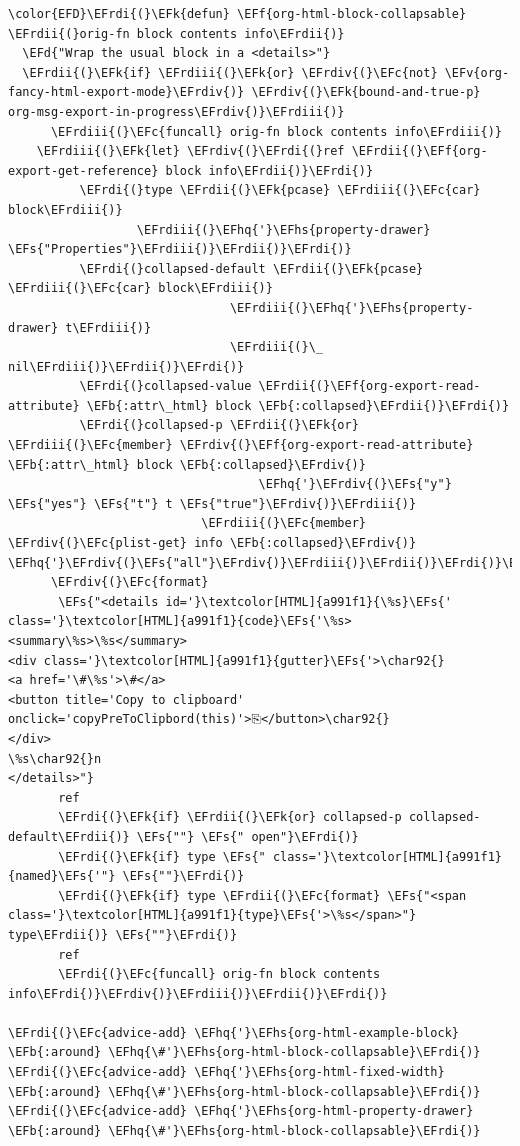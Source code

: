 \documentclass{scrartcl}
\newcommand{\EFk}[1]{\textcolor{EFk}{#1}} %
\newcommand{\EFd}[1]{\textcolor{EFd}{#1}} %
\newcommand{\EFs}[1]{\textcolor{EFs}{#1}} %
\newcommand{\EFb}[1]{\textcolor{EFb}{#1}} %
\newcommand{\EFc}[1]{\textcolor{EFc}{#1}} %
\newcommand{\EFv}[1]{\textcolor{EFv}{#1}} %
\newcommand{\EFf}[1]{\textcolor{EFf}{#1}} %
\newcommand{\EFhq}[1]{#1} %
\newcommand{\EFhs}[1]{#1} %
\newcommand{\EFrdi}[1]{#1} %
\newcommand{\EFrdii}[1]{#1} %
\newcommand{\EFrdiii}[1]{#1} %
\newcommand{\EFrdiv}[1]{#1} %
\begin{document}
\begin{Code}
\begin{Verbatim}[]
\color{EFD}\EFrdi{(}\EFk{defun} \EFf{org-html-block-collapsable} \EFrdii{(}orig-fn block contents info\EFrdii{)}
  \EFd{"Wrap the usual block in a <details>"}
  \EFrdii{(}\EFk{if} \EFrdiii{(}\EFk{or} \EFrdiv{(}\EFc{not} \EFv{org-fancy-html-export-mode}\EFrdiv{)} \EFrdiv{(}\EFk{bound-and-true-p} org-msg-export-in-progress\EFrdiv{)}\EFrdiii{)}
      \EFrdiii{(}\EFc{funcall} orig-fn block contents info\EFrdiii{)}
    \EFrdiii{(}\EFk{let} \EFrdiv{(}\EFrdi{(}ref \EFrdii{(}\EFf{org-export-get-reference} block info\EFrdii{)}\EFrdi{)}
          \EFrdi{(}type \EFrdii{(}\EFk{pcase} \EFrdiii{(}\EFc{car} block\EFrdiii{)}
                  \EFrdiii{(}\EFhq{'}\EFhs{property-drawer} \EFs{"Properties"}\EFrdiii{)}\EFrdii{)}\EFrdi{)}
          \EFrdi{(}collapsed-default \EFrdii{(}\EFk{pcase} \EFrdiii{(}\EFc{car} block\EFrdiii{)}
                               \EFrdiii{(}\EFhq{'}\EFhs{property-drawer} t\EFrdiii{)}
                               \EFrdiii{(}\_ nil\EFrdiii{)}\EFrdii{)}\EFrdi{)}
          \EFrdi{(}collapsed-value \EFrdii{(}\EFf{org-export-read-attribute} \EFb{:attr\_html} block \EFb{:collapsed}\EFrdii{)}\EFrdi{)}
          \EFrdi{(}collapsed-p \EFrdii{(}\EFk{or} \EFrdiii{(}\EFc{member} \EFrdiv{(}\EFf{org-export-read-attribute} \EFb{:attr\_html} block \EFb{:collapsed}\EFrdiv{)}
                                   \EFhq{'}\EFrdiv{(}\EFs{"y"} \EFs{"yes"} \EFs{"t"} t \EFs{"true"}\EFrdiv{)}\EFrdiii{)}
                           \EFrdiii{(}\EFc{member} \EFrdiv{(}\EFc{plist-get} info \EFb{:collapsed}\EFrdiv{)} \EFhq{'}\EFrdiv{(}\EFs{"all"}\EFrdiv{)}\EFrdiii{)}\EFrdii{)}\EFrdi{)}\EFrdiv{)}
      \EFrdiv{(}\EFc{format}
       \EFs{"<details id='}\textcolor[HTML]{a991f1}{\%s}\EFs{' class='}\textcolor[HTML]{a991f1}{code}\EFs{'\%s>
<summary\%s>\%s</summary>
<div class='}\textcolor[HTML]{a991f1}{gutter}\EFs{'>\char92{}
<a href='\#\%s'>\#</a>
<button title='Copy to clipboard' onclick='copyPreToClipbord(this)'>⎘</button>\char92{}
</div>
\%s\char92{}n
</details>"}
       ref
       \EFrdi{(}\EFk{if} \EFrdii{(}\EFk{or} collapsed-p collapsed-default\EFrdii{)} \EFs{""} \EFs{" open"}\EFrdi{)}
       \EFrdi{(}\EFk{if} type \EFs{" class='}\textcolor[HTML]{a991f1}{named}\EFs{'"} \EFs{""}\EFrdi{)}
       \EFrdi{(}\EFk{if} type \EFrdii{(}\EFc{format} \EFs{"<span class='}\textcolor[HTML]{a991f1}{type}\EFs{'>\%s</span>"} type\EFrdii{)} \EFs{""}\EFrdi{)}
       ref
       \EFrdi{(}\EFc{funcall} orig-fn block contents info\EFrdi{)}\EFrdiv{)}\EFrdiii{)}\EFrdii{)}\EFrdi{)}

\EFrdi{(}\EFc{advice-add} \EFhq{'}\EFhs{org-html-example-block}   \EFb{:around} \EFhq{\#'}\EFhs{org-html-block-collapsable}\EFrdi{)}
\EFrdi{(}\EFc{advice-add} \EFhq{'}\EFhs{org-html-fixed-width}     \EFb{:around} \EFhq{\#'}\EFhs{org-html-block-collapsable}\EFrdi{)}
\EFrdi{(}\EFc{advice-add} \EFhq{'}\EFhs{org-html-property-drawer} \EFb{:around} \EFhq{\#'}\EFhs{org-html-block-collapsable}\EFrdi{)}
\end{Verbatim}
\end{Code}
\end{document}
